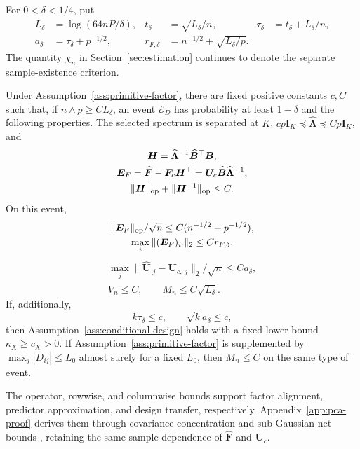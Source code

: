 For $0<\delta<1/4$, put
\begin{equation}
 \begin{aligned}
 L_\delta&=\log(64nP/\delta),&
 t_\delta&=\sqrt{L_\delta/n},&
 \tau_\delta&=t_\delta+L_\delta/n,\\
 a_\delta&=\tau_\delta+p^{-1/2},&
 r_{F,\delta}&=n^{-1/2}+\sqrt{L_\delta/p}.&&
 \end{aligned}
 \label{eq:primitive-rates}
\end{equation}
The quantity $\chi_n$ in Section~\ref{sec:estimation} continues to denote the separate sample-existence criterion.

\begin{proposition}
\label{prop:pca-design-event}
Under Assumption~\ref{ass:primitive-factor}, there are fixed positive constants $c,C$ such that, if $n\wedge p\ge CL_\delta$, an event $\mathcal E_D$ has probability at least $1-\delta$ and the following properties. The selected spectrum is separated at $K$, $cp\bm{I}_K\preceq\widehat{\bm{\Lambda}}\preceq Cp\bm{I}_K$, and
\begin{equation}
\begin{gathered}
\bm H=\widehat{\bm\Lambda}^{-1}\widehat{\bm B}^\top\bm B,\\
\bm E_F=\widehat{\bm F}-\bm F_c\bm H^\top
       =\bm U_c\widehat{\bm B}\widehat{\bm\Lambda}^{-1},\\
\|\bm H\|_{\rm op}+\|\bm H^{-1}\|_{\rm op}\le C.
\end{gathered}
\label{eq:pca-alignment-event}
\end{equation}
On this event,
\begin{equation}
\begin{gathered}
\|\bm E_F\|_{\rm op}/\sqrt n\le C(n^{-1/2}+p^{-1/2}),\\
\max_i\|(\bm E_F)_{i\cdot}\|_2\le Cr_{F,\delta}.
\end{gathered}\label{eq:pca-factor-rates}
\end{equation}
\begin{equation}
\begin{gathered}
\max_j\|\widehat{\bm U}_{\cdot j}-\bm U_{c,\cdot j}\|_2/\sqrt n\le Ca_\delta,\\
V_n\le C,\qquad M_n\le C\sqrt{L_\delta}.
\end{gathered}\label{eq:pca-residual-rates}
\end{equation}
If, additionally,
\begin{equation}
 k\tau_\delta\le c,\qquad \sqrt{k}a_\delta\le c,
 \label{eq:pca-re-requirements}
\end{equation}
then Assumption~\ref{ass:conditional-design} holds with a fixed lower bound $\kappa_X\ge c_X>0$. If Assumption~\ref{ass:primitive-factor} is supplemented by $\max_j|D_{ij}|\le L_0$ almost surely for a fixed $L_0$, then $M_n\le C$ on the same type of event.
\end{proposition}
The operator, rowwise, and columnwise bounds support factor alignment, predictor approximation, and design transfer, respectively. Appendix~\ref{app:pca-proof} derives them through covariance concentration and sub-Gaussian net bounds \citep{Vershynin2012}, retaining the same-sample dependence of $\widehat{\bm{F}}$ and $\bm{U}_c$.

